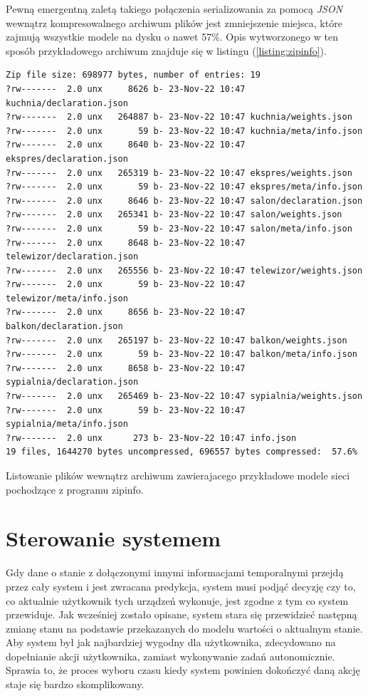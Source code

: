 Pewną emergentną zaletą takiego połączenia serializowania za pomocą \textit{JSON} wewnątrz kompresowalnego archiwum plików jest zmniejszenie miejsca, które zajmują wszystkie modele na dysku o nawet 57\%. Opis wytworzonego w ten sposób przykładowego archiwum znajduje się w listingu (\ref{listing:zipinfo}).

\begin{listing}
\begin{verbatim}
Zip file size: 698977 bytes, number of entries: 19
?rw-------  2.0 unx     8626 b- 23-Nov-22 10:47 kuchnia/declaration.json
?rw-------  2.0 unx   264887 b- 23-Nov-22 10:47 kuchnia/weights.json
?rw-------  2.0 unx       59 b- 23-Nov-22 10:47 kuchnia/meta/info.json
?rw-------  2.0 unx     8640 b- 23-Nov-22 10:47 ekspres/declaration.json
?rw-------  2.0 unx   265319 b- 23-Nov-22 10:47 ekspres/weights.json
?rw-------  2.0 unx       59 b- 23-Nov-22 10:47 ekspres/meta/info.json
?rw-------  2.0 unx     8646 b- 23-Nov-22 10:47 salon/declaration.json
?rw-------  2.0 unx   265341 b- 23-Nov-22 10:47 salon/weights.json
?rw-------  2.0 unx       59 b- 23-Nov-22 10:47 salon/meta/info.json
?rw-------  2.0 unx     8648 b- 23-Nov-22 10:47 telewizor/declaration.json
?rw-------  2.0 unx   265556 b- 23-Nov-22 10:47 telewizor/weights.json
?rw-------  2.0 unx       59 b- 23-Nov-22 10:47 telewizor/meta/info.json
?rw-------  2.0 unx     8656 b- 23-Nov-22 10:47 balkon/declaration.json
?rw-------  2.0 unx   265197 b- 23-Nov-22 10:47 balkon/weights.json
?rw-------  2.0 unx       59 b- 23-Nov-22 10:47 balkon/meta/info.json
?rw-------  2.0 unx     8658 b- 23-Nov-22 10:47 sypialnia/declaration.json
?rw-------  2.0 unx   265469 b- 23-Nov-22 10:47 sypialnia/weights.json
?rw-------  2.0 unx       59 b- 23-Nov-22 10:47 sypialnia/meta/info.json
?rw-------  2.0 unx      273 b- 23-Nov-22 10:47 info.json
19 files, 1644270 bytes uncompressed, 696557 bytes compressed:  57.6%
\end{verbatim}
\caption{Listowanie plików wewnątrz archiwum zawierajacego przykładowe modele sieci pochodzące z programu zipinfo.} \label{listing:zipinfo}
\end{listing}

\section{Sterowanie systemem}
Gdy dane o stanie z dołączonymi innymi informacjami temporalnymi przejdą przez cały system i jest zwracana predykcja, system musi podjąć decyzję czy to, co aktualnie użytkownik tych urządzeń wykonuje, jest zgodne z tym co system przewiduje. Jak wcześniej zostało opisane, system stara się przewidzieć następną zmianę stanu na podstawie przekazanych do modelu wartości o aktualnym stanie. Aby system był jak najbardziej wygodny dla użytkownika, zdecydowano na dopełnianie akcji użytkownika, zamiast wykonywanie zadań autonomicznie. Sprawia to, że proces wyboru czasu kiedy system powinien dokończyć daną akcję staje się bardzo skomplikowany.

